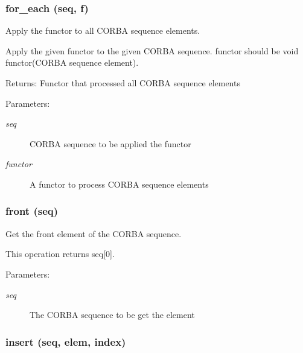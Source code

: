 \subsubsection{\setlength{\rightskip}{0pt plus 5cm}for\_\-each (seq, f)}\label{CORBA__SeqEx_8py_a0}


Apply the functor to all CORBA sequence elements. 

Apply the given functor to the given CORBA sequence. functor should be void functor(CORBA sequence element).

\begin{Desc}
\item[Returns:]Functor that processed all CORBA sequence elements \end{Desc}
\begin{Desc}
\item[Parameters:]
\begin{description}
\item[{\em seq}]CORBA sequence to be applied the functor \item[{\em functor}]A functor to process CORBA sequence elements\end{description}
\end{Desc}
\subsubsection{\setlength{\rightskip}{0pt plus 5cm}front (seq)}\label{CORBA__SeqEx_8py_a4}


Get the front element of the CORBA sequence. 

This operation returns seq[0].

\begin{Desc}
\item[Parameters:]
\begin{description}
\item[{\em seq}]The CORBA sequence to be get the element\end{description}
\end{Desc}
\subsubsection{\setlength{\rightskip}{0pt plus 5cm}insert (seq, elem, index)}\label{CORBA__SeqEx_8py_a3}


